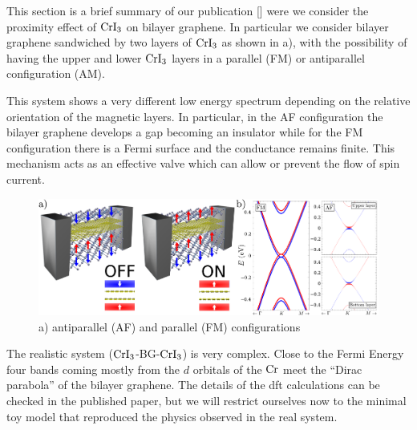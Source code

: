 This section is a brief summary of our publication [] were we consider the proximity effect of $\ce{CrI_3}$ on bilayer graphene. In particular we consider bilayer graphene sandwiched by two layers of $\ce{CrI_3}$ as shown in a), with the possibility of having the upper and lower $\ce{CrI_3}$ layers in a parallel (FM) or antiparallel configuration (AM).

This system shows a very different low energy  spectrum depending on the relative orientation of the magnetic layers. In particular, in the AF configuration the bilayer graphene develops a gap becoming an insulator while for the FM configuration there is a Fermi surface and the conductance remains finite. This mechanism acts as an effective valve which can allow or prevent the flow of spin current.


\begin{figure}[h!]
\centering
\includegraphics{graphene_bilayer/figures/cri3_valve.pdf}
\vspace{-5pt}
\caption{a) antiparallel (AF) and parallel (FM) configurations}
\label{cri3}
\end{figure}

The realistic system ($\ce{CrI_3}$-BG-$\ce{CrI_3}$) is very complex. Close to the Fermi Energy four bands coming mostly from the $d$ orbitals of the $\ce{Cr}$ meet the ``Dirac parabola'' of the bilayer graphene. The details of the \ac{dft} calculations can be checked in the published paper\cite{Cardoso2018}, but we will restrict ourselves now to the minimal toy model that reproduced the physics observed in the real system.


